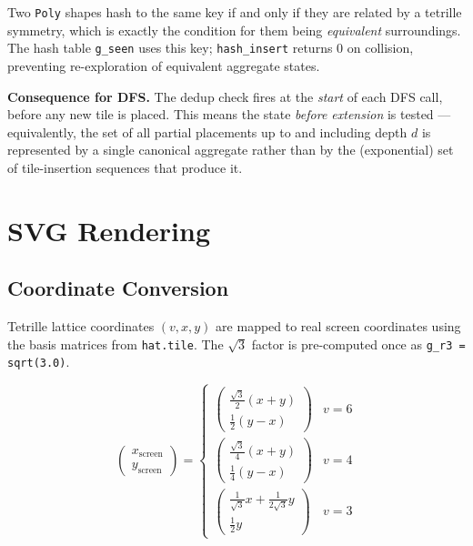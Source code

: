 \documentclass[10pt,a4paper]{article}
\let\polysection\section
\renewcommand\section{\needspace{0.16\textheight}\polysection}
\let\polysubsection\subsection
\renewcommand\subsection{\needspace{0.12\textheight}\polysubsection}
\newcommand{\code}[1]{\texttt{\small #1}}
\newcommand{\file}[1]{\texttt{\footnotesize #1}}
\begin{document}
Two \code{Poly} shapes hash to the same key if and only if they are
related by a tetrille symmetry, which is exactly the condition for them
being \emph{equivalent} surroundings.  The hash table \code{g\_seen}
uses this key; \code{hash\_insert} returns 0 on collision, preventing
re-exploration of equivalent aggregate states.

\medskip
\noindent\textbf{Consequence for DFS.}  The dedup check fires at the
\emph{start} of each DFS call, before any new tile is placed.  This
means the state \emph{before extension} is tested — equivalently, the
set of all partial placements up to and including depth $d$ is
represented by a single canonical aggregate rather than by the
(exponential) set of tile-insertion sequences that produce it.

\section{SVG Rendering}

\subsection{Coordinate Conversion}

Tetrille lattice coordinates $(v, x, y)$ are mapped to real screen
coordinates using the basis matrices from \file{hat.tile}.  The
$\sqrt{3}$ factor is pre-computed once as \code{g\_r3 = sqrt(3.0)}.

\[
  \begin{pmatrix} x_\text{screen} \\ y_\text{screen} \end{pmatrix}
  =
  \begin{cases}
    \begin{pmatrix} \tfrac{\sqrt{3}}{2}(x+y) \\ \tfrac{1}{2}(y-x) \end{pmatrix}
    & v = 6 \\[6pt]
    \begin{pmatrix} \tfrac{\sqrt{3}}{4}(x+y) \\ \tfrac{1}{4}(y-x) \end{pmatrix}
    & v = 4 \\[6pt]
    \begin{pmatrix} \tfrac{1}{\sqrt{3}}x + \tfrac{1}{2\sqrt{3}}y \\ \tfrac{1}{2}y \end{pmatrix}
    & v = 3
  \end{cases}
\]
\end{document}

